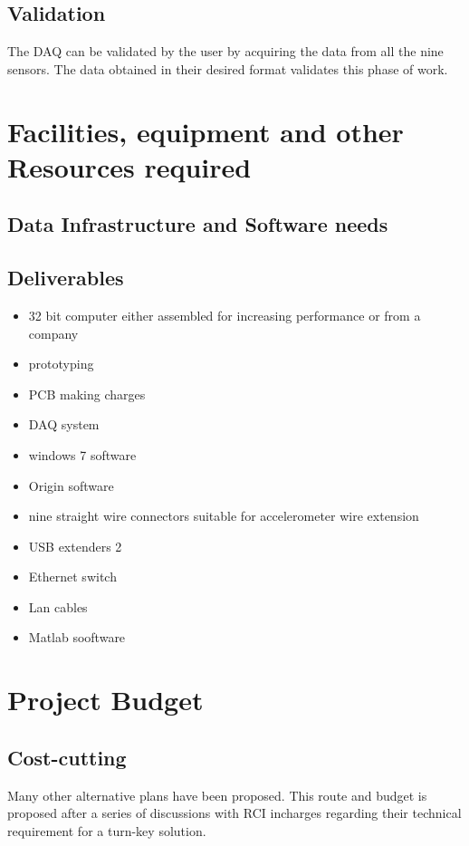 \documentclass{FR16}
\begin{document}
   \subsection{Validation}
The DAQ can be validated by the user by acquiring the data from all the nine sensors. The data obtained in their desired format validates this phase of work.


\newpage
\section{Facilities, equipment and other Resources required}




\subsection{Data Infrastructure and Software needs}



\subsection{Deliverables}

\begin{itemize}
    \item 32 bit computer either assembled for increasing performance or from a company
    \item prototyping
    \item PCB making charges
    \item DAQ system
    \item windows 7 software
    \item Origin software
    \item nine straight wire connectors suitable for accelerometer wire extension
    \item  USB extenders 2
    \item Ethernet switch
    \item Lan cables
    \item Matlab sooftware
\end{itemize}

\section{Project Budget}
 \subsection{Cost-cutting}
Many other alternative plans have been proposed. This route and budget is proposed after a series of discussions with RCI incharges regarding their technical requirement for a turn-key solution.
\end{document}
